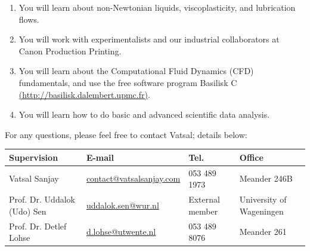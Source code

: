 \documentclass[a4paper,10pt]{article}
\begin{document}
\begin{enumerate}
\item You will learn about non-Newtonian liquids, viscoplasticity, and lubrication flows. 
\item You will work with experimentalists and our industrial collaborators at Canon Production Printing. 
\item You will learn about the Computational Fluid Dynamics (CFD) fundamentals, and use the free software program Basilisk C \href{http://basilisk.dalembert.upmc.fr}{(http://basilisk.dalembert.upmc.fr)}.
\item You will learn how to do basic and advanced scientific data analysis.
\end{enumerate}
For any questions, please feel free to contact Vatsal; details below: 

\begin{center}
\begin{tabular}{|l|l|l|l|}
\hline \textbf{Supervision} & \textbf{E-mail} & \textbf{Tel.} & \textbf{Office} \\ 
\hline Vatsal Sanjay & \href{mailto:contact@vatsalsanjay.com}{contact@vatsalsanjay.com} & 053 489 1973 & Meander 246B \\ 
\hline Prof. Dr. Uddalok (Udo) Sen & \href{mailto:uddalok.sen@wur.nl }{uddalok.sen@wur.nl} & External member & University of Wageningen \\ 
\hline Prof. Dr. Detlef Lohse & \href{mailto:d.lohse@utwente.nl}{d.lohse@utwente.nl} & 053 489 8076 & Meander 261 \\ 
\hline 
\end{tabular} 
\end{center}



\end{document}
